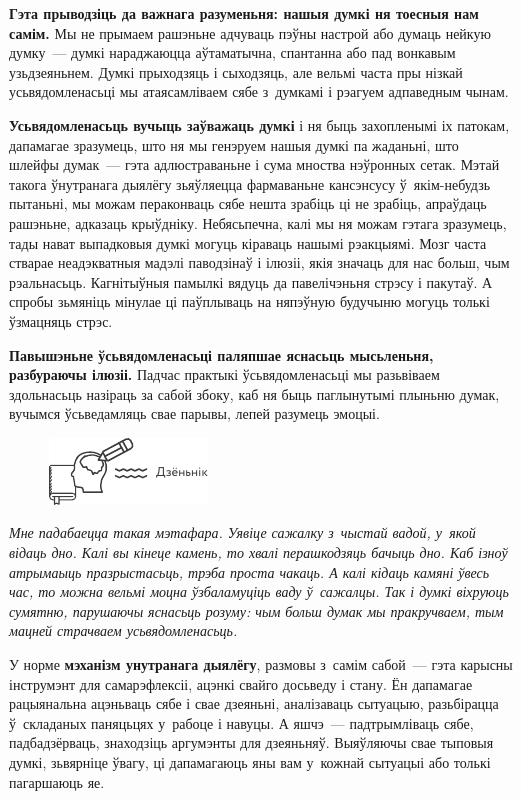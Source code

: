 \textbf{Гэта прыводзіць да важнага разуменьня: нашыя думкі ня тоесныя нам самім.} Мы не прымаем рашэньне адчуваць пэўны настрой або думаць нейкую думку~--- думкі нараджаюцца аўтаматычна, спантанна або пад вонкавым узьдзеяньнем. Думкі прыходзяць і сыходзяць, але вельмі часта пры нізкай усьвядомленасьці мы атаясамліваем сябе з~думкамі і рэагуем адпаведным чынам.

\textbf{Усьвядомленасьць вучыць заўважаць думкі} і ня быць захопленымі іх патокам, дапамагае зразумець, што ня мы генэруем нашыя думкі па жаданьні, што шлейфы думак~--- гэта адлюстраваньне і сума мноства нэўронных сетак. Мэтай такога ўнутранага дыялёгу зьяўляецца фармаваньне кансэнсусу ў~якім-небудзь пытаньні, мы можам пераконваць сябе нешта зрабіць ці не зрабіць, апраўдаць рашэньне, адказаць крыўдніку. Небясьпечна, калі мы ня можам гэтага зразумець, тады нават выпадковыя думкі могуць кіраваць нашымі рэакцыямі. Мозг часта стварае неадэкватныя мадэлі паводзінаў і ілюзіі, якія значаць для нас больш, чым рэальнасьць. Кагнітыўныя памылкі вядуць да павелічэньня стрэсу і пакутаў. А спробы зьмяніць мінулае ці паўплываць на няпэўную будучыню могуць толькі ўзмацняць стрэс.

\textbf{Павышэньне ўсьвядомленасьці паляпшае яснасьць мысьленьня, разбураючы ілюзіі.} Падчас практыкі ўсьвядомленасьці мы разьвіваем здольнасьць назіраць за сабой збоку, каб ня быць паглынутымі плыньню думак, вучымся ўсьведамляць свае парывы, лепей разумець эмоцыі.

\begin{figure}[htb!]
  \centering
  \includegraphics[scale=1.5]{willpower/ch8/13.pdf}
\end{figure}

\emph{Мне падабаецца такая мэтафара. Уявіце сажалку з~чыстай вадой, у~якой відаць дно. Калі вы кінеце камень, то хвалі перашкодзяць бачыць дно. Каб ізноў атрымаыць празрыстасьць, трэба проста чакаць. А калі кідаць камяні ўвесь час, то можна вельмі моцна ўзбаламуціць ваду ў~сажалцы. Так і думкі віхруюць сумятню, парушаючы яснасьць розуму: чым больш думак мы пракручваем, тым мацней страчваем усьвядомленасьць.}

У норме \textbf{мэханізм унутранага дыялёгу}, размовы з~самім сабой~--- гэта карысны інструмэнт для самарэфлексіі, ацэнкі свайго досьведу і стану. Ён дапамагае рацыянальна ацэньваць сябе і свае дзеяньні, аналізаваць сытуацыю, разьбірацца ў~складаных паняцьцях у~рабоце і навуцы. А яшчэ~--- падтрымліваць сябе, падбадзёрваць, знаходзіць аргумэнты для дзеяньняў. Выяўляючы свае тыповыя думкі, зьвярніце ўвагу, ці дапамагаюць яны вам у~кожнай сытуацыі або толькі пагаршаюць яе.


